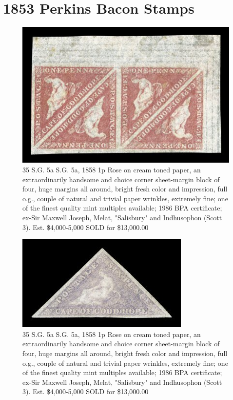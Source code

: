 \chapter{1853 Perkins Bacon Stamps}    

\begin{figure}[htbp]
\centering
\includegraphics[width=.80\textwidth]{../cape-of-good-hope/SG5a.jpg}
\caption{35		S.G. 5a	S.G. 5a, 1858 1p Rose on cream toned paper, an extraordinarily handsome and choice corner sheet-margin block of four, huge margins all around, bright fresh color and impression, full o.g., couple of natural and trivial paper wrinkles, extremely fine; one of the finest quality mint multiples available; 1986 BPA certificate; ex-Sir Maxwell Joseph, Melat, "Salisbury" and Indhusophon (Scott 3).  Est. \$4,000-5,000 
SOLD for \$13,000.00}
\end{figure}


\begin{figure}[htbp]
\centering
\includegraphics[width=.40\textwidth]{../cape-of-good-hope/SG7.jpg}
\caption{35		S.G. 5a	S.G. 5a, 1858 1p Rose on cream toned paper, an extraordinarily handsome and choice corner sheet-margin block of four, huge margins all around, bright fresh color and impression, full o.g., couple of natural and trivial paper wrinkles, extremely fine; one of the finest quality mint multiples available; 1986 BPA certificate; ex-Sir Maxwell Joseph, Melat, "Salisbury" and Indhusophon (Scott 3).  Est. \$4,000-5,000 
SOLD for \$13,000.00}
\end{figure}


